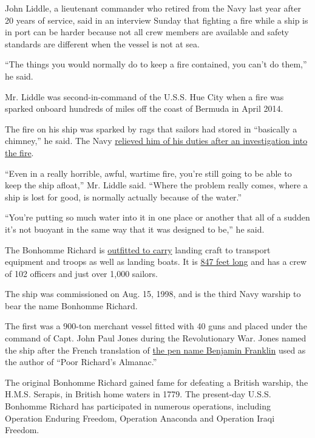 John Liddle, a lieutenant commander who retired from the Navy last year
after 20 years of service, said in an interview Sunday that fighting a
fire while a ship is in port can be harder because not all crew members
are available and safety standards are different when the vessel is not
at sea.

``The things you would normally do to keep a fire contained, you can't
do them,'' he said.

Mr. Liddle was second-in-command of the U.S.S. Hue City when a fire was
sparked onboard hundreds of miles off the coast of Bermuda in April
2014.

The fire on his ship was sparked by rags that sailors had stored in
``basically a chimney,'' he said. The Navy
\href{https://www.navy.mil/submit/display.asp?story_id=81920}{relieved
him of his duties after an investigation into the fire}.

``Even in a really horrible, awful, wartime fire, you're still going to
be able to keep the ship afloat,'' Mr. Liddle said. ``Where the problem
really comes, where a ship is lost for good, is normally actually
because of the water.''

``You're putting so much water into it in one place or another that all
of a sudden it's not buoyant in the same way that it was designed to
be,'' he said.

The Bonhomme Richard is
\href{https://www.navy.mil/navydata/fact_display.asp?cid=4200\&tid=400\&ct=4}{outfitted
to carry} landing craft to transport equipment and troops as well as
landing boats. It is
\href{https://www.nvr.navy.mil/SHIPDETAILS/SHIPSDETAIL_LHD_6_2395.HTML}{847
feet long} and has a crew of 102 officers and just over 1,000 sailors.

The ship was commissioned on Aug. 15, 1998, and is the third Navy
warship to bear the name Bonhomme Richard.

The first was a 900-ton merchant vessel fitted with 40 guns and placed
under the command of Capt. John Paul Jones during the Revolutionary War.
Jones named the ship after the French translation of
\href{https://www.public.navy.mil/surfor/lhd6/Pages/namesake.aspx}{the
pen name Benjamin Franklin} used as the author of ``Poor Richard's
Almanac.''

The original Bonhomme Richard gained fame for defeating a British
warship, the H.M.S. Serapis, in British home waters in 1779. The
present-day U.S.S. Bonhomme Richard has participated in numerous
operations, including Operation Enduring Freedom, Operation Anaconda and
Operation Iraqi Freedom.


